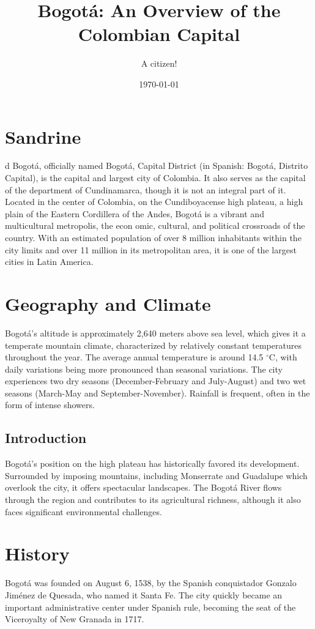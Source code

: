 \documentclass{article}
\title{Bogotá: An Overview of the Colombian Capital}
\author{A citizen!}
\date{\today}
\begin{document}
\maketitle

\section{Sandrine}
d
Bogotá, officially named Bogotá, Capital District (in Spanish: Bogotá, Distrito Capital), is the capital and largest city of Colombia. It also serves as the capital of the department of Cundinamarca, though it is not an integral part of it. Located in the center of Colombia, on the Cundiboyacense high plateau, a high plain of the Eastern Cordillera of the Andes, Bogotá is a vibrant and multicultural metropolis, the econ
omic, cultural, and political crossroads of the country. With an estimated population of over 8 million inhabitants within the city limits and over 11 million in its metropolitan area, it is one of the largest cities in Latin America.

\section{Geography and Climate}
Bogotá's altitude is approximately 2,640 meters above sea level, which gives it a temperate mountain climate, characterized by relatively constant temperatures throughout the year. The average annual temperature is around 14.5 $^\circ$C, with daily variations being more pronounced than seasonal variations. The city experiences two dry seasons (December-February and July-August) and two wet seasons (March-May and September-November). Rainfall is frequent, often in the form of intense showers.

\subsection{Introduction}
Bogotá's position on the high plateau has historically favored its development. Surrounded by imposing mountains, including Monserrate and Guadalupe which overlook the city, it offers spectacular landscapes. The Bogotá River flows through the region and contributes to its agricultural richness, although it also faces significant environmental challenges.

\section{History}
Bogotá was founded on August 6, 1538, by the Spanish conquistador Gonzalo Jiménez de Quesada, who named it Santa Fe. The city quickly became an important administrative center under Spanish rule, becoming the seat of the Viceroyalty of New Granada in 1717.
\end{document}
